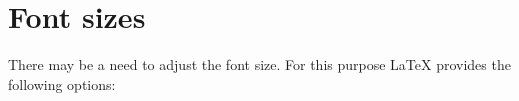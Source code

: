 
\section{Font sizes}
\label{sec:Font sizes}

There may be a need to adjust the font size. For this purpose \LaTeX{} provides
the following options:

